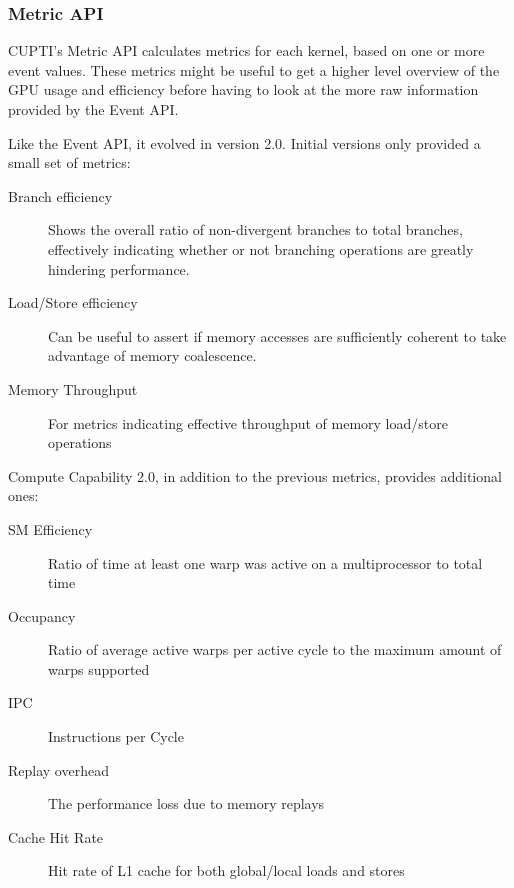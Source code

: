 \subsubsection{Metric API}
\label{sec:cuda:prof:metric}

CUPTI's Metric API calculates metrics for each kernel, based on one or more event values. These metrics might be useful to get a higher level overview of the GPU usage and efficiency before having to look at the more raw information provided by the Event API.

Like the Event API, it evolved in version 2.0. Initial versions only provided a small set of metrics:

\begin{description}
	\item[Branch efficiency] Shows the overall ratio of non-divergent branches to total branches, effectively indicating whether or not branching operations are greatly hindering performance.

	\item[Load/Store efficiency] Can be useful to assert if memory accesses are sufficiently coherent to take advantage of memory coalescence.

	\item[Memory Throughput] For metrics indicating effective throughput of memory load/store operations
\end{description}

Compute Capability 2.0, in addition to the previous metrics, provides additional ones:

\begin{description}
	\item[SM Efficiency] Ratio of time at least one warp was active on a multiprocessor to total time

	\item[Occupancy] Ratio of average active warps per active cycle to the maximum amount of warps supported

	\item[IPC] Instructions per Cycle

	\item[Replay overhead] The performance loss due to memory replays

	\item[Cache Hit Rate] Hit rate of L1 cache for both global/local loads and stores

\end{description}
